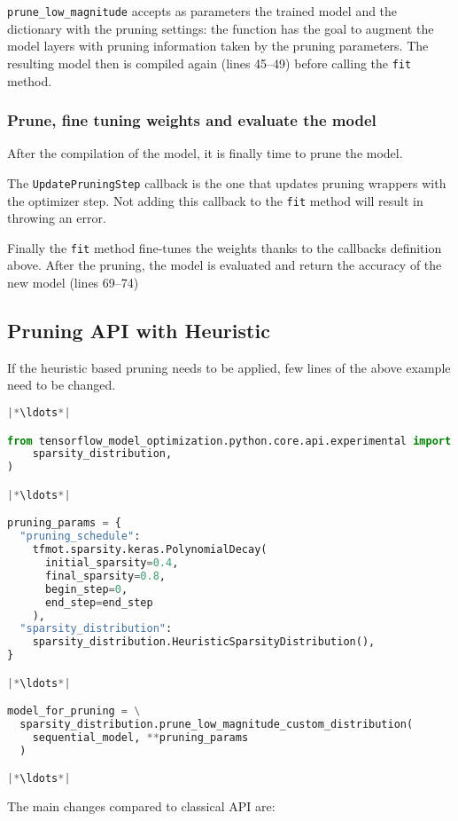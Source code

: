 \texttt{prune\_low\_magnitude} accepts as parameters the trained model and the
dictionary with the pruning settings: the function has the goal to augment the
model layers with pruning information taken by the pruning parameters.
The resulting model then is compiled again (lines 45--49) before calling the
\texttt{fit} method.

\subsubsection{Prune, fine tuning weights and evaluate the model}
After the compilation of the model, it is finally time to prune the model.

The \texttt{UpdatePruningStep} callback is the one that updates pruning
wrappers with the optimizer step. Not adding this callback to the \texttt{fit}
method will result in throwing an error.

Finally the \texttt{fit} method fine-tunes the weights thanks to the callbacks
definition above.
After the pruning, the model is evaluated and return the accuracy of the new
model (lines 69--74)

\subsection{Pruning API with Heuristic}
If the heuristic based pruning needs to be applied, few lines of the above
example need to be changed.

\begin{lstlisting}[language=Python, caption=Pruning with Heuristic]
|*\ldots*|

from tensorflow_model_optimization.python.core.api.experimental import (
    sparsity_distribution,
)

|*\ldots*|

pruning_params = {
  "pruning_schedule":
    tfmot.sparsity.keras.PolynomialDecay(
      initial_sparsity=0.4,
      final_sparsity=0.8,
      begin_step=0,
      end_step=end_step
    ),
  "sparsity_distribution":
    sparsity_distribution.HeuristicSparsityDistribution(),
}

|*\ldots*|

model_for_pruning = \
  sparsity_distribution.prune_low_magnitude_custom_distribution(
    sequential_model, **pruning_params
  )

|*\ldots*|
\end{lstlisting}

The main changes compared to classical API are:

